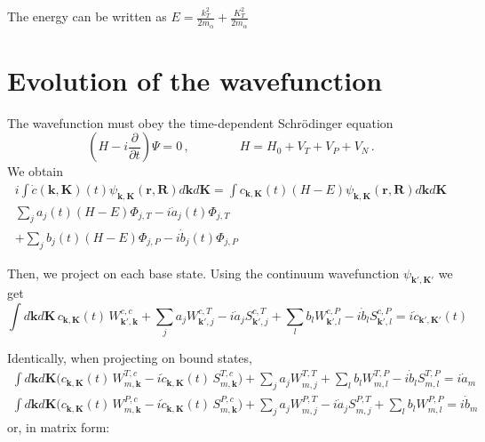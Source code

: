 The energy can be written as $E=\frac{k_{T}^{2}}{2 m_{\alpha}}+
\frac{K_{T}^{2}}{2 m_{\alpha}} $


\section{Evolution of the wavefunction}
The wavefunction must obey the time-dependent Schr\"{o}dinger equation
\begin{equation}\label{Q:CE-tdse}
  \left( H - i\frac{\partial }{\partial t} \right)\Psi = 0\, , \qquad
  \qquad H=H_{0} + V_{T} + V_{P}+ V_{N} \,.
\end{equation}
%
We obtain
\begin{eqnarray}
i \int \dot{c}(\mathbf{k},\mathbf{K})(t)
\psi_{\mathbf{k},\mathbf{K}}(\mathbf{r},\mathbf{R}) d \mathbf{k} d
\mathbf{K}
  =
\int c_{\mathbf{k},\mathbf{K}}(t) \left( H - E \right)
\psi_{\mathbf{k},\mathbf{K}}(\mathbf{r},\mathbf{R})  d \mathbf{k} d \mathbf{K} \\
  \sum_{j}  a_{j}(t) \left( H - E \right) \Phi_{j,T}
  - i \dot{a}_{j}(t) \Phi_{j,T}
  \nonumber \\
+ \sum_{j} b_{j}(t) \left( H - E \right) \Phi_{j,P} -
  i \dot{b}_{j}(t) \Phi_{j,P}
 \nonumber
\end{eqnarray}

Then, we project on each base state. Using the continuum wavefunction
$\psi_{\mathbf{k}',\mathbf{K}'}$ we get
\[
\int  d \mathbf{k} d \mathbf{K}  \,  c_{\mathbf{k},\mathbf{K}}(t) \,
W^{c,c}_{\mathbf{k}',\mathbf{k}}  + \sum_{j} a_{j}
W^{c,T}_{\mathbf{k}',j} - i \dot{a}_{j} S^{c,T}_{\mathbf{k}',j} +
\sum_{l} b_{l} W^{c,P}_{\mathbf{k}',l} - i \dot{b}_{l}
S^{c,P}_{\mathbf{k}',l} = i \dot{c}_{\mathbf{k}',\mathbf{K}'}(t)
\]

Identically, when projecting on bound states,
\begin{eqnarray*}
\int  d \mathbf{k} d \mathbf{K}  \Big( c_{\mathbf{k},\mathbf{K}}(t) \,
W^{T,c}_{m,\mathbf{k}} - i \dot{c}_{\mathbf{k},\mathbf{K}}(t)
\,S^{T,c}_{m,\mathbf{k}} \Big) + \sum_{j} a_{j} W^{T,T}_{m,j} +
\sum_{l} b_{l} W^{T,P}_{m,l} - i \dot{b}_{l} S^{T,P}_{m,l} = i
\dot{a}_{m}\nonumber
  \\ %
\int  d \mathbf{k} d \mathbf{K}  \Big( c_{\mathbf{k},\mathbf{K}}(t) \,
W^{P,c}_{m,\mathbf{k}} - i \dot{c}_{\mathbf{k},\mathbf{K}}(t)
\,S^{P,c}_{m,\mathbf{k}} \Big) + \sum_{j} a_{j} W^{P,T}_{m,j} - i
\dot{a}_{j} S^{P,T}_{m,j} + \sum_{l} b_{l} W^{P,P}_{m,l} = i
\dot{b}_{m} \nonumber
\end{eqnarray*}
or, in matrix form:



